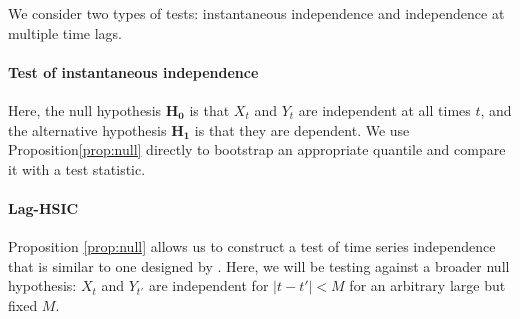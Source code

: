 We consider two types of tests: instantaneous independence and independence at multiple time lags.





\paragraph{Test of instantaneous independence}
 
Here, the null hypothesis  $\mathbf{H_0}$ is that  $X_t$ and $Y_t$ are independent at all times $t$,  and the alternative hypothesis $\mathbf{H_1}$ is that they are dependent. We use Proposition\ref{prop:null} directly to bootstrap an appropriate quantile and compare it with a test statistic.  

\paragraph{Lag-HSIC}
Proposition \ref{prop:null} allows us to construct a test of time series independence that is similar to one designed by  \cite{besserve_statistical_2013}. Here, we will be testing against a broader null hypothesis:  $X_t$ and $Y_{t'}$ are independent for $|t-t'|<M$ for an arbitrary large but fixed $M$. 

